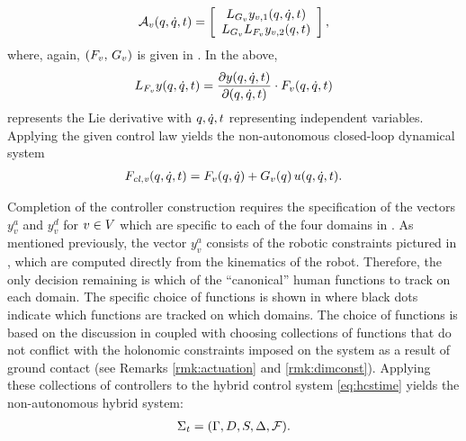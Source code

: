 \begin{align*}
  \mathcal{A}_{v}(q, \dot{q}, t) =
  \left[\begin{array}{c}
      L_{G_{v}} y_{v,1} (q, \dot{q}, t)\\
      L_{G_{v}} L_{F_{v}} y_{v,2}(q, t)
    \end{array}\right],
\end{align*}
where, again, $(F_{v}, \, G_{v})$ is given in .
%
In the above,
\begin{align*}
  L_{F_{v}} y(q, \dot{q}, t) = \frac{\partial{y(q, \dot{q}, t)}}{\partial{(q, \dot{q}, t)}} \cdot
  F_{v}(q, \dot{q}, t)
\end{align*}
represents the Lie derivative with $q, \dot{q}, t$ representing independent
variables.
Applying the given control law yields the non-autonomous closed-loop dynamical
system
\begin{align}
  \label{eq:clsys}
  F_\mathit{cl,v}(q, \dot{q}, t) = F_{v}(q, \dot{q}) + G_{v}(q) \, u(q, \dot{q}, t).
\end{align}

Completion of the controller construction requires the specification of the
vectors $y^{a}_{v}$ and $y^{d}_{v}$ for $v \in V$ which are specific to each
of the four domains in .
%
As mentioned previously, the vector $y^a_v$ consists of the robotic constraints
pictured in , which are computed directly from the
kinematics of the robot.
%
Therefore, the only decision remaining is which of the ``canonical'' human
functions to track on each domain.
%
The specific choice of functions is shown in  where black
dots indicate which functions are tracked on which domains.
%
The choice of functions is based on the discussion in 
coupled with choosing collections of functions that do not conflict with the
holonomic constraints imposed on the system as a result of ground contact (see
Remarks \ref{rmk:actuation} and \ref{rmk:dimconst}).
%
Applying these collections of controllers to the hybrid control system
\eqref{eq:hcstime} yields the non-autonomous hybrid system:
%
\begin{align}
  \label{eq:hstime}
  \Sigma_t = (\Gamma, D, S, \Delta, \mathcal{F}).
\end{align}

